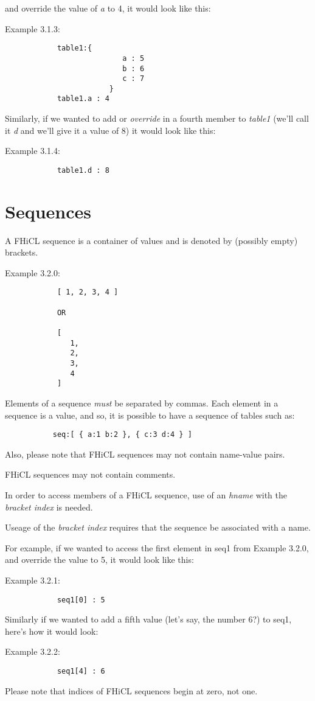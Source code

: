 \documentclass{memarticle}
\begin{document}
		and override the value of \emph{a} to 4, it would look like this:
		\par
		Example 3.1.3:
		\begin{verbatim}
			table1:{
                           a : 5
                           b : 6
                           c : 7
                        }
			table1.a : 4
		\end{verbatim}
		\par
		Similarly, if we wanted to add or \emph{override} in a fourth member to \emph{table1}
		(we'll call it \emph{d} and we'll give it a value of 8)
		it would look like this:
		\par
		Example 3.1.4:
		\begin{verbatim}
			table1.d : 8
		\end{verbatim}
		\par
	\section{Sequences}
		A FHiCL sequence is a container of values
		and is denoted by (possibly empty) brackets.
		\par
		Example 3.2.0:
		\begin{verbatim}
			[ 1, 2, 3, 4 ]
			
			OR

			[
			   1,
			   2,
			   3,
			   4
			]
		\end{verbatim}
		\par
		Elements of a sequence \emph{must} be separated by commas.
		Each element in a sequence is a value, and so,
		it is possible to have a sequence of tables such as:
		\begin{verbatim}
		   seq:[ { a:1 b:2 }, { c:3 d:4 } ]
		\end{verbatim}
		\par
		Also, please note that FHiCL sequences may not contain name-value pairs.
		\par
		FHiCL sequences may not contain comments.
		\par
		In order to access members of a FHiCL sequence, use of an \emph{hname}
		with the \emph{bracket index} is needed.
		\par
		Useage of the \emph{bracket index} requires that the sequence be associated with a name.
		\par
		For example, if we wanted to access the first element in seq1 from Example 3.2.0,
		and override the value to 5, it would look like this:
		\par
		Example 3.2.1:
		\begin{verbatim}
			seq1[0] : 5
		\end{verbatim}
		\par
		Similarly if we wanted to add a fifth value (let's say, the number 6?) to seq1,
		here's how it would look:
		\par
		Example 3.2.2:
		\begin{verbatim}
			seq1[4] : 6
		\end{verbatim}
		\par
		Please note that indices of FHiCL sequences begin at zero, not one.
\end{document}
